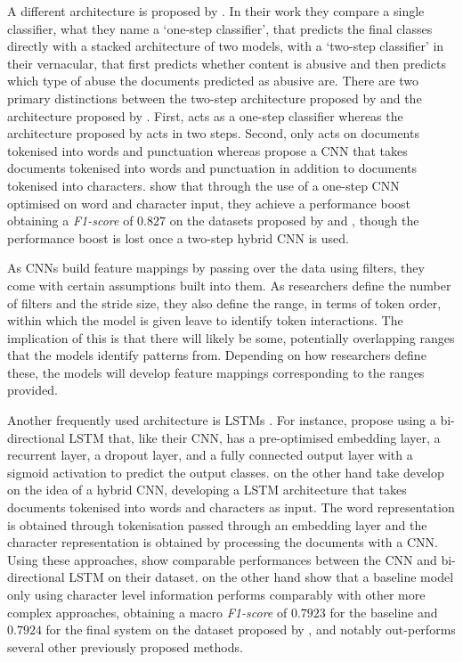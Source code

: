 A different architecture is proposed by \citet{Park:2017}.
In their work they compare a single classifier, what they name a `one-step classifier', that predicts the final classes directly with a stacked architecture of two models, with a `two-step classifier' in their vernacular, that first predicts whether content is abusive and then predicts which type of abuse the documents predicted as abusive are.
There are two primary distinctions between the two-step architecture proposed by \citet{Park:2017} and the architecture proposed by \citet{Kolhatkar:2020}.
First, \citet{Kolhatkar:2020} acts as a one-step classifier whereas the architecture proposed by \citet{Park:2017} acts in two steps.
Second, \citet{Kolhatkar:2020} only acts on documents tokenised into words and punctuation whereas \citet{Park:2017} propose a CNN that takes documents tokenised into words and punctuation in addition to documents tokenised into characters.
\citet{Park:2017} show that through the use of a one-step CNN optimised on word and character input, they achieve a performance boost obtaining a \textit{F1-score} of $0.827$ on the datasets proposed by \citet{Waseem-Hovy:2016} and \citet{Waseem:2016}, though the performance boost is lost once a two-step hybrid CNN is used.

As CNNs build feature mappings by passing over the data using filters, they come with certain assumptions built into them.
As researchers define the number of filters and the stride size, they also define the range, in terms of token order, within which the model is given leave to identify token interactions.
The implication of this is that there will likely be some, potentially overlapping ranges that the models identify patterns from.
Depending on how researchers define these, the models will develop feature mappings corresponding to the ranges provided.

Another frequently used architecture is LSTMs \citep{Badjatiya:2017,Kolhatkar:2020,Meyer:2019}.
For instance, \citet{Kolhatkar:2020} propose using a bi-directional LSTM that, like their CNN, has a pre-optimised embedding layer, a recurrent layer, a dropout layer, and a fully connected output layer with a sigmoid activation to predict the output classes.
\citet{Meyer:2019} on the other hand take develop on the idea of a hybrid CNN, developing a LSTM architecture that takes documents tokenised into words and characters as input.
The word representation is obtained through tokenisation passed through an embedding layer and the character representation is obtained by processing the documents with a CNN.
Using these approaches, \citet{Kolhatkar:2020} show comparable performances between the CNN and bi-directional LSTM on their dataset.
\citet{Meyer:2019} on the other hand show that a baseline model only using character level information performs comparably with other more complex approaches, obtaining a macro \textit{F1-score} of $0.7923$ for the baseline and $0.7924$ for the final system on the dataset proposed by \citet{Waseem-Hovy:2016}, and notably out-performs several other previously proposed methods.


